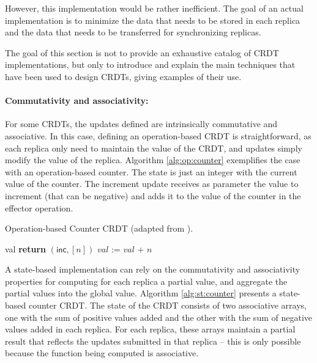 \documentclass[11pt,a4paper]{article}
\begin{document}
However, this implementation would be rather inefficient. 
The goal of an actual implementation is to minimize the data that needs 
to be stored in each replica and the data that needs to be transferred for
synchronizing replicas.

The goal of this section is not to provide an exhaustive catalog of CRDT 
implementations, but only to introduce and explain the main techniques that 
have been used to design CRDTs, giving examples of their use.

\paragraph{Commutativity and associativity:}
For some CRDTs, the updates defined are intrinsically commutative and associative.
In this case, defining an operation-based CRDT is straightforward, as each replica
only need to maintain the value of the CRDT, and updates simply modify the value of the replica.
Algorithm \ref{alg:op:counter} exemplifies the case with an operation-based counter.
The state is just an integer with the current value of the counter. 
The increment update receives as parameter the value to increment (that can be negative)
and adds it to the value of the counter in the effector operation.

\begin{algorithm}
\caption{Operation-based Counter CRDT (adapted from \cite{Shapiro11Comprehensive}).}
\label{alg:op:counter}
\begin{algorithmic}[1]
\EndPayload
{}
\State \Return val
\EndQuery
{}
\State \textbf{return} $(\mathsf{inc}, [n])$ 
\EndAtSource
{}
\State $\mathit{val}$ := $\mathit{val}$ + $n$
\EndDownstream
\EndUpdateOp
\end{algorithmic}
\end{algorithm}

A state-based implementation can rely on the commutativity and associativity properties
for computing for each replica a partial value, and aggregate the partial
values into the global value. 
Algorithm \ref{alg:st:counter} presents a state-based counter CRDT.
The state of the CRDT consists of two associative arrays, 
one with the sum of positive values added and the other with the sum of
negative values added in each replica. 
For each replica, these arrays maintain a partial result that reflects the 
updates submitted in that replica -- this is only possible because the function being
computed is associative.
\end{document}
